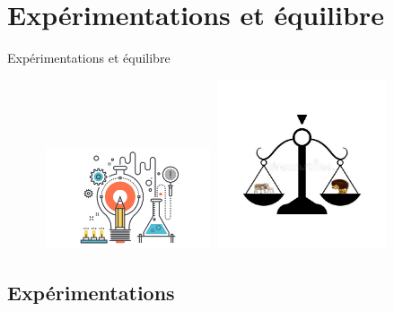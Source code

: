 \documentclass{beamer}
\begin{document}
\section{Expérimentations et équilibre}
%
\begin{frame}{Expérimentations et équilibre}
    \begin{figure}[h]
        \begin{minipage}[c]{.46\linewidth}
            \centering
            \includegraphics[width=5cm, height=3cm]{images/experi.png}
        \end{minipage}
        \hfill%
        \begin{minipage}[c]{.46\linewidth}
            \centering
            \includegraphics[width=5cm, height=5cm]{images/balance.jpg}
        \end{minipage}
    \end{figure}
\end{frame}

\subsection{Expérimentations}
\end{document}
